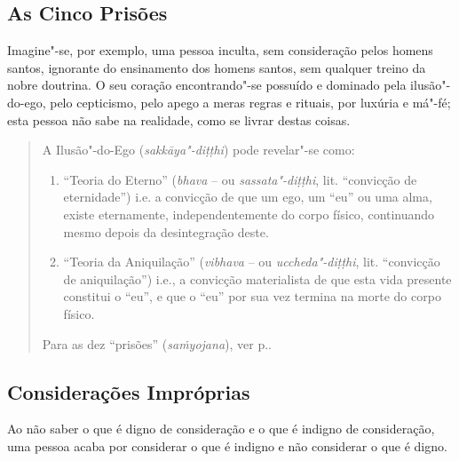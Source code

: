 
\subsection{As Cinco Prisões}


Imagine"-se, por exemplo, uma pessoa inculta, sem consideração pelos homens
santos, ignorante do ensinamento dos homens santos, sem qualquer treino da nobre
doutrina. O seu coração encontrando"-se possuído e dominado pela ilusão"-do-ego,
pelo cepticismo, pelo apego a meras regras e rituais, por luxúria e má"-fé; esta
pessoa não sabe na realidade, como se livrar destas coisas.


\clearpage

\begin{quote}
  A Ilusão"-do-Ego (\emph{sakkāya"-di\d{t}\d{t}hi}) pode revelar"-se como:

  \begin{enumerate}

    \item “Teoria do Eterno” (\emph{bhava} -- ou
          \emph{sassata"-di\d{t}\d{t}hi}, lit. “convicção de eternidade”) i.e.
          a convicção de que um ego, um “eu” ou uma alma, existe eternamente,
          independentemente do corpo físico, continuando mesmo depois da
          desintegração deste.

    \item “Teoria da Aniquilação” (\emph{vibhava} -- ou
          \emph{uccheda"-di\d{t}\d{t}hi}, lit. “convicção de aniquilação”)
          i.e., a convicção materialista de que esta vida presente constitui o
          “eu”, e que o “eu” por sua vez termina na morte do corpo físico.

  \end{enumerate}

  Para as dez “prisões” (\emph{sa\.{m}yojana}), ver p.\pageref{dez-prisoes}.
\end{quote}

\subsection{Considerações Impróprias}

Ao não saber o que é digno de consideração e o que é indigno de consideração,
uma pessoa acaba por considerar o que é indigno e não considerar o que é digno.

